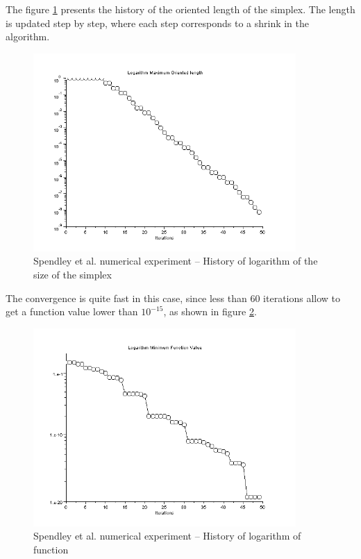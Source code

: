 The figure \ref{fig-spendley-numexp1-sigma} presents the history of the oriented
length of the simplex. The length is updated step by step, where each step 
corresponds to a shrink in the algorithm.

\begin{figure}
\begin{center}
\includegraphics[width=10cm]{spendleymethod/quad2bis-spendley-history-sigma.png}
\end{center}
\caption{Spendley et al. numerical experiment -- History of logarithm of the size of the simplex}
\label{fig-spendley-numexp1-sigma}
\end{figure}

The convergence is quite fast in this case, since less than 60 iterations
allow to get a function value lower than $10^{-15}$, as shown in 
figure \ref{fig-spendley-numexp1-logfopt}.

\begin{figure}
\begin{center}
\includegraphics[width=10cm]{spendleymethod/quad2bis-spendley-history-logfopt.png}
\end{center}
\caption{Spendley et al. numerical experiment -- History of logarithm of function}
\label{fig-spendley-numexp1-logfopt}
\end{figure}

